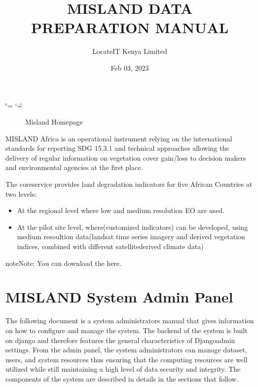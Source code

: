 \documentclass[letterpaper,10pt,english]{sphinxmanual}
\title{MISLAND DATA PREPARATION MANUAL}
\date{Feb 03, 2023}
\author{LocateIT Kenya Limited}
\let\sphinxpxdimen\pdfpxdimen\else\newdimen\sphinxpxdimen
\begin{document}
\ifdefined\shorthandoff
  \ifnum\catcode`\=\string=\active\shorthandoff{=}\fi
  \ifnum\catcode`\"=\active{}\fi
\fi

\pagestyle{empty}
\sphinxmaketitle
\pagestyle{plain}
\sphinxtableofcontents
\pagestyle{normal}
\label{\detokenize{index::doc}}


\begin{figure}[H]
\centering
\capstart

\noindent\sphinxincludegraphics[width=800\sphinxpxdimen,height=400\sphinxpxdimen]{{home}.png}
\caption{Misland Homepage}\label{\detokenize{index:id1}}\end{figure}

\sphinxAtStartPar
MISLAND Africa is an operational instrument relying on the international standards for reporting SDG 15.3.1 and technical approaches allowing the delivery of regular information on vegetation cover gain/loss to decision makers and environmental agencies at the first place.

\sphinxAtStartPar
The core\sphinxhyphen{}service provides land degradation indicators for five African Countries at two levels:
\begin{itemize}
\item {} 
\sphinxAtStartPar
At the regional level where low and medium resolution EO are used.

\item {} 
\sphinxAtStartPar
At the pilot site level, where(customized indicators) can be developed, using medium resoultion data(landsat time series imagery and derived vegetation indices, combined with different satellite\sphinxhyphen{}derived climate data)

\end{itemize}

\begin{sphinxadmonition}{note}{Note:}
\sphinxAtStartPar
You can download the  here.
\end{sphinxadmonition}

\sphinxstepscope


\chapter{MISLAND System Admin Panel}
\label{\detokenize{Introduction/admin:misland-system-admin-panel}}\label{\detokenize{Introduction/admin::doc}}
\sphinxAtStartPar
The following document is a system administrators manual that gives information on how to configure and manage the system. The backend of the system is built on django and therefore features the general characteristics of Django\sphinxhyphen{}admin settings. From the admin panel, the system administrators can manage dataset, users, and system resources thus ensuring that the computing resources are well utilized while still maintaining a high level of data security and integrity. The components of the system are described in details in the sections that follow.
\end{document}
